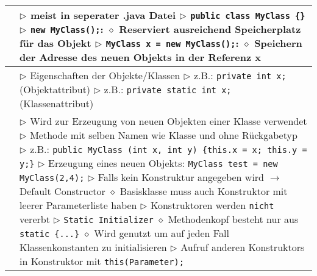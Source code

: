 	\begin{longtable}{ | p{} p{} | }
	\hline

	\makecell[l]{Erzeugung} & \makecell[l]{
	$\triangleright$ meist in seperater .java Datei  \\
	$\triangleright$ \texttt{public class MyClass \{\}} \\
	$\triangleright$ \texttt{new MyClass();}: \\
	\hspace{0.4cm} $\diamond$ Reserviert ausreichend Speicherplatz für das Objekt \\ 
	$\triangleright$ \texttt{MyClass x = new MyClass();}: \\
	\hspace{0.4cm} $\diamond$ Speichern der Adresse des neuen Objekts in der Referenz x } \\ \hline
	
	\makecell[l]{Attribute} & \makecell[l]{
	$\triangleright$ Eigenschaften der Objekte/Klassen \\
	$\triangleright$ z.B.: \texttt{private int x;} (Objektattribut) \\
	$\triangleright$ z.B.: \texttt{private static int x;} (Klassenattribut)  } \\ \hline
	
	\makecell[l]{Konstruktor} & \makecell[l]{
	$\triangleright$ Wird zur Erzeugung von neuen Objekten einer Klasse verwendet \\
	$\triangleright$ Methode mit selben Namen wie Klasse und ohne Rückgabetyp \\
	$\triangleright$ z.B.: \texttt{public MyClass (int x, int y) \{this.x = x; this.y = y;\}} \\
	$\triangleright$ Erzeugung eines neuen Objekts: \texttt{MyClass test = new MyClass(2,4);} \\
	$\triangleright$ Falls kein Konstruktur angegeben wird $\rightarrow$ Default Constructor \\
	\hspace{0.4cm} $\diamond$ Basisklasse muss auch Konstruktor mit leerer Parameterliste haben \\
	$\triangleright$ Konstruktoren werden \texttt{nicht} vererbt \\
	$\triangleright$ \texttt{Static Initializer} \\
	\hspace{0.4cm} $\diamond$ Methodenkopf besteht nur aus \texttt{static \{...\}} \\
	\hspace{0.4cm} $\diamond$ Wird genutzt um auf jeden Fall Klassenkonstanten zu initialisieren \\
	$\triangleright$ Aufruf anderen Konstruktors in Konstruktor mit \texttt{this(Parameter);}} \\ \hline


\end{longtable}
